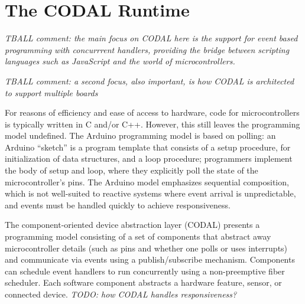 \section{The CODAL Runtime}
\label{sec:codal}

\emph{TBALL comment: the main focus on CODAL here is the support for event based programming with concurrrent handlers,
   providing the bridge between scripting languages such as JavaScript and the world of microcontrollers. }

\emph{TBALL comment: a second focus, also important, is how CODAL is architected to support multiple boards}

For reasons of efficiency and ease of access to hardware, code for microcontrollers is typically written in C and/or C++. 
However, this still leaves the programming model undefined. The Arduino programming model is based on polling: 
an Arduino ``sketch'' is a program template that consists of a setup procedure, for initialization of data structures,
and a loop procedure; programmers implement the body of setup and loop, where they explicitly poll the state of the
microcontroller’s pins. The Arduino model emphasizes sequential composition, which is not well-suited to reactive
systems where event arrival is unpredictable, and events must be handled quickly to achieve responsiveness.

The component-oriented device abstraction layer (CODAL) presents a programming model consisting of a set of
components that abstract away microcontroller details (such as pins and whether one polls or uses interrupts)
and communicate via events using a publish/subscribe mechanism.  Components can schedule event handlers to run
concurrently using a non-preemptive fiber scheduler. Each software component abstracts a hardware feature, sensor,
or connected device. \emph{TODO: how CODAL handles responsiveness?}

